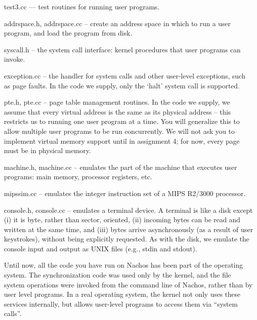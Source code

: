 \begin{description}

\item test3.cc --- test routines for running user programs.

\item addrspace.h, addrspace.cc -- create an address space in which
to run a user program, and load the program from disk.

\item syscall.h -- the system call interface: kernel procedures that 
user programs can invoke.

\item exception.cc -- the handler for system calls and other user-level
exceptions, such as page faults.  In the code we supply, only the 
`halt' system call is supported.

\item pte.h, pte.cc -- page table management routines.  In the code
we supply, we assume that every virtual address is the same as its 
physical address -- this restricts us to running one user program at 
a time.  You will generalize this to allow multiple user programs to
be run concurrently.  We will not ask you to implement virtual 
memory support until in assignment 4; for now, every page must 
be in physical memory.  

\item machine.h, machine.cc -- emulates the part of the machine that
executes user programs: main memory, processor registers, etc.

\item mipssim.cc -- emulates the integer instruction set of a 
MIPS R2/3000 processor.

\item console.h, console.cc -- emulates a terminal device.  A terminal
is like a disk except (i) it is byte, rather than sector, oriented, 
(ii) incoming bytes can be read and written at the same time, and (iii)
bytes arrive asynchronously (as a result of user keystrokes), without 
being explicitly requested.  As with the disk, we emulate the console
input and output as UNIX files (e.g., stdin and stdout).

\end{description}

Until now, all the code you have run on Nachos has been part of the
operating system.  The synchronization code was used only by the kernel,
and the file system operations were invoked from the command line of 
Nachos, rather than by user level programs.  In a
real operating system, the kernel not only uses these services internally,
but allows user-level programs to access them via ``system calls''.

